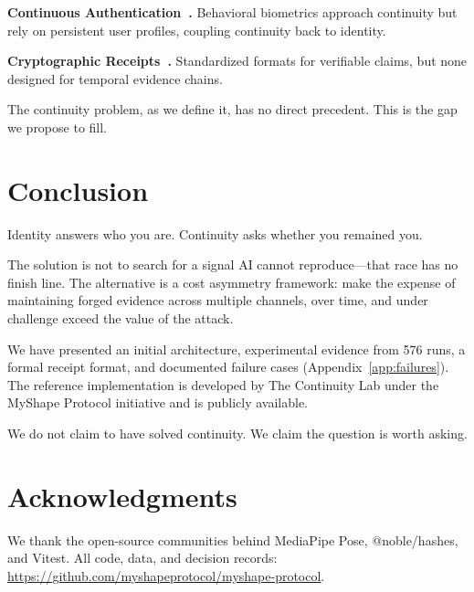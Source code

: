 \documentclass[conference]{IEEEtran}
\begin{document}
\textbf{Continuous Authentication~\cite{schlegel2017continuous,wang2022cross,zhang2023challenge}.} Behavioral biometrics approach continuity but rely on persistent user profiles, coupling continuity back to identity.

\textbf{Cryptographic Receipts~\cite{iacr2022receipt,rfc8949,rfc7519}.} Standardized formats for verifiable claims, but none designed for temporal evidence chains.

The continuity problem, as we define it, has no direct precedent. This is the gap we propose to fill.

\section{Conclusion}

Identity answers who you are. Continuity asks whether you remained you.

The solution is not to search for a signal AI cannot reproduce---that race has no finish line. The alternative is a cost asymmetry framework: make the expense of maintaining forged evidence across multiple channels, over time, and under challenge exceed the value of the attack.

We have presented an initial architecture, experimental evidence from 576 runs, a formal receipt format, and documented failure cases (Appendix~\ref{app:failures}). The reference implementation is developed by The Continuity Lab under the MyShape Protocol initiative and is publicly available.

We do not claim to have solved continuity. We claim the question is worth asking.

\section*{Acknowledgments}

We thank the open-source communities behind MediaPipe Pose, @noble/hashes, and Vitest. All code, data, and decision records: \url{https://github.com/myshapeprotocol/myshape-protocol}.




\appendix

\end{document}
